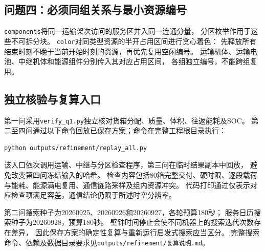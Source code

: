 \documentclass[bwprint]{gmcmthesis}
\begin{document}
\begin{appendices}
\clearpage
\subsection{问题四：必须同组关系与最小资源编号}
\texttt{components}将同一运输架次访问的服务区并入同一连通分量，
分区枚举作用于这些不可拆分块。
\texttt{color}对同类型资源的半开占用区间进行贪心着色：
先释放所有结束时刻不晚于当前开始时刻的资源，再优先复用空闲编号。
运输机体、运输电池、中继机体和能源组件分别传入其对应占用区间，
各组独立编号，不能跨组复用。


\subsection{独立核验与复算入口}
第一问采用\texttt{verify\_q1.py}独立核对货箱分配、质量、体积、往返能耗及SOC。
第二至四问通过以下命令回放已保存方案；命令在完整工程根目录执行：
\begin{lstlisting}[style=appendixcore,language={},numbers=none]
python outputs/refinement/replay_all.py
\end{lstlisting}
该入口依次调用运输、中继与分区检查程序，第三问在临时结果副本中回放，
避免改变第四问冻结输入的哈希。
检查内容包括80箱完整交付、硬时限、逐段载荷与能耗、能源满电复用、通信链路采样及组内资源冲突。
代码打印通过仅表示对应检查项满足容差，通信结论仍限于所述时空分辨率。

第二问搜索种子为20260925、20260926和20260927，各轮预算180秒；
服务日历搜索种子为20260928，预算180秒。
壁钟时间停止会使不同机器上的搜索迭代次数存在差异，
因此保存方案的确定性复算与重新运行启发式搜索应当区分。
完整搜索命令、依赖及数据目录要求见\texttt{outputs/refinement/复算说明.md}。
\end{appendices}
\end{document}
